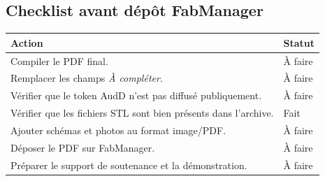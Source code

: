 \subsection{Checklist avant dépôt FabManager}

\begin{longtable}{|p{10cm}|p{3cm}|}
\hline
\textbf{Action} & \textbf{Statut} \\
\hline
Compiler le PDF final. & À faire \\
\hline
Remplacer les champs \textit{À compléter}. & À faire \\
\hline
Vérifier que le token AudD n'est pas diffusé publiquement. & À faire \\
\hline
Vérifier que les fichiers STL sont bien présents dans l'archive. & Fait \\
\hline
Ajouter schémas et photos au format image/PDF. & À faire \\
\hline
Déposer le PDF sur FabManager. & À faire \\
\hline
Préparer le support de soutenance et la démonstration. & À faire \\
\hline
\end{longtable}
